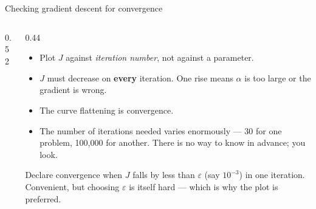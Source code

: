 \documentclass[aspectratio=169,10pt]{beamer}
\begin{document}
\begin{frame}{Checking gradient descent for convergence}
  \begin{columns}[T,onlytextwidth]
    \begin{column}{0.52\textwidth}
      \par
    \end{column}
    \begin{column}{0.44\textwidth}
      \footnotesize
      \begin{itemize}
        \item Plot $J$ against \emph{iteration number}, not against a parameter.
        \item $J$ must decrease on \textbf{every} iteration. One rise means $\alpha$ is too
              large or the gradient is wrong.
        \item The curve flattening is convergence.
        \item The number of iterations needed varies enormously --- 30 for one problem,
              100{,}000 for another. There is no way to know in advance; you look.
      \end{itemize}
      \begin{defnbox}
        \footnotesize
        Declare convergence when $J$ falls by less than $\varepsilon$ (say $10^{-3}$) in one
        iteration. Convenient, but choosing $\varepsilon$ is itself hard --- which is why the
        plot is preferred.
      \end{defnbox}
    \end{column}
  \end{columns}
\end{frame}
\end{document}
